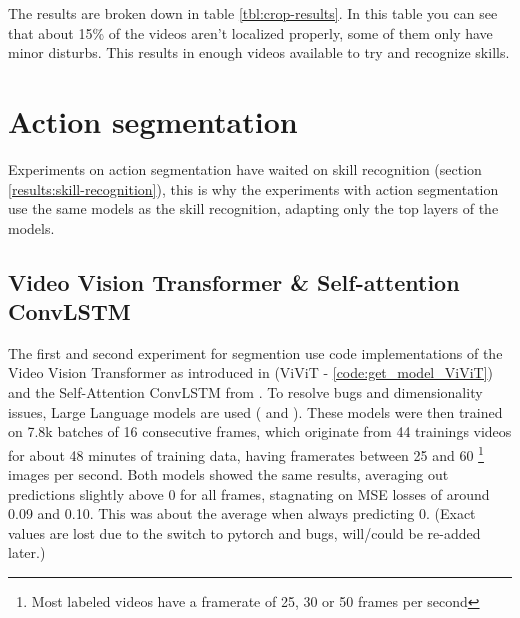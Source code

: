 The results are broken down in table \ref{tbl:crop-results}. In this table you can see that about 15\% of the videos aren't localized properly, some of them only have minor disturbs. This results in enough videos available to try and recognize skills.












\section{Action segmentation}

Experiments on action segmentation have waited on skill recognition (section \ref{results:skill-recognition}), this is why the experiments with action segmentation use the same models as the skill recognition, adapting only the top layers of the models.

\subsection{Video Vision Transformer \& Self-attention ConvLSTM}
\label{subsec:video-models-from-scratch}

The first and second experiment for segmention use code implementations of the Video Vision Transformer as introduced in \textcite{Arnab2021} (ViViT - \ref{code:get_model_ViViT}) and the Self-Attention ConvLSTM from \textcite{Lin_2020}.
To resolve bugs and dimensionality issues, Large Language models are used (\autocite{OpenAI_ChatGPT_2025} and \autocite{Deepseek_2025}).
These models were then trained on 7.8k batches of 16 consecutive frames, which originate from 44 trainings videos for about 48 minutes of training data, having framerates between 25 and 60 \footnote{Most labeled videos have a framerate of 25, 30 or 50 frames per second} images per second.
Both models showed the same results, averaging out predictions slightly above 0 for all frames, stagnating on MSE losses of around 0.09 and 0.10. This was about the average when always predicting 0. (Exact values are lost due to the switch to pytorch and bugs, will/could be re-added later.)

